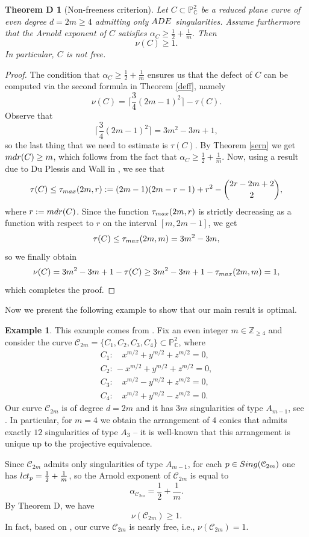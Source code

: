 \documentclass[12pt]{article}
\theoremstyle{plain}
\newtheorem*{theoremD}{Theorem D}
\theoremstyle{definition}
\newtheorem{example}[thm]{Example}
\begin{document}
\begin{theoremD}[Non-freeness criterion]
\label{nfc}
Let $C \subset \mathbb{P}^{2}_{\mathbb{C}}$ be a reduced plane curve of even degree $d=2m\geq 4$ admitting only ${\rm ADE}$ singularities. Assume furthermore that the Arnold exponent of $C$ satisfies $\alpha_{C} \geq \frac{1}{2} + \frac{1}{m}$. Then
$$\nu(C) \geq 1.$$
In particular, $C$ is not free.
\end{theoremD}
\begin{proof}
The condition that $\alpha_{C} \geq \frac{1}{2} + \frac{1}{m}$ ensures us that the defect of $C$ can be computed via the second formula in Theorem \ref{deff}, namely
 $$\nu(C) = \bigg\lceil\frac{3}{4}(2m-1)^{2}\bigg\rceil - \tau(C).$$
 Observe that $$\bigg\lceil\frac{3}{4}(2m-1)^{2}\bigg\rceil = 3m^{2}-3m+1,$$
 so the last thing that we need to estimate is $\tau(C)$. By Theorem \ref{sern} we get ${\rm mdr}(C) \geq m$, which follows from the fact that $\alpha_{C} \geq \frac{1}{2} + \frac{1}{m}$. Now, using a result due to Du Plessis and Wall in \cite[Theorem 3.2]{duP}, we see that
 $$\tau(C) \leq \tau_{{\rm max}}(2m,r) := (2m-1)(2m-r-1)+r^{2} -\binom{2r-2m+2}{2},$$
 where $r:={\rm mdr}(C)$.
 Since the function $\tau_{{\rm max}}(2m,r)$ is strictly decreasing as a function with respect to $r$ on the interval $[m, 2m-1]$, we get
 $$\tau(C) \leq  \tau_{{\rm max}}(2m,m) = 3m^{2}-3m,$$
 so we finally obtain
 $$\nu(C) = 3m^{2}-3m+1 -\tau(C) \geq 3m^{2}-3m+1 - \tau_{{\rm max}}(2m,m) = 1,$$
 which completes the proof.
\end{proof}
Now we present the following example to show that our main result is optimal.
\begin{example}
This example comes from \cite[7.5 Lemma]{Persson}. Fix an even integer $m \in \mathbb{Z}_{\geq 4}$ and consider the curve $\mathcal{C}_{2m} = \{C_{1}, C_{2}, C_{3}, C_{4}\} \subset \mathbb{P}^{2}_{\mathbb{C}}$, where
\begin{equation*}
\begin{array}{l}
C_{1} :\quad  x^{m/2} + y^{m/2} + z^{m/2} =0,\\
C_{2} :\, -x^{m/2} + y^{m/2} + z^{m/2} =0,\\
C_{3} :\quad  x^{m/2} - y^{m/2} + z^{m/2} =0,\\
C_{4} :\quad x^{m/2} + y^{m/2} - z^{m/2} =0.
\end{array}
\end{equation*}
Our curve $\mathcal{C}_{2m}$ is of degree $d=2m$ and it has $3m$ singularities of type $A_{m-1}$, see \cite[Lemma 7.5]{Persson}. In particular, for $m=4$ we obtain the arrangement of $4$ conics that admits exactly $12$ singularities of type $A_{3}$ -- it is well-known that this arrangement is unique up to the projective equivalence. 

Since $\mathcal{C}_{2m}$ admits only singularities of type $A_{m-1}$, for each $p \in {\rm Sing}(\mathcal{C}_{2m})$ one has ${\rm lct}_{p}=\frac{1}{2} + \frac{1}{m}$, so the Arnold exponent of $\mathcal{C}_{2m}$ is equal to 
$$\alpha_{\mathcal{C}_{2m}} = \frac{1}{2} + \frac{1}{m}.$$ By Theorem D, we have 
$$\nu(\mathcal{C}_{2m}) \geq 1.$$
In fact, based on \cite[Theorem 3.12]{Artal}, our curve $\mathcal{C}_{2m}$ is nearly free, i.e., $\nu(\mathcal{C}_{2m})=1$.
\end{example}
\end{document}
